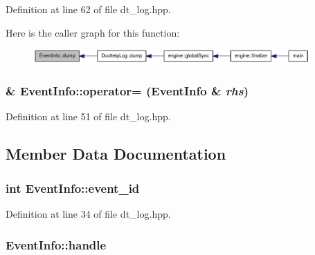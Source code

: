 Definition at line 62 of file dt\_\-log.hpp.

Here is the caller graph for this function:\nopagebreak
\begin{figure}[H]
\begin{center}
\leavevmode
\includegraphics[width=299pt]{struct_event_info_a3e4a489eec9f1f7bf9cc9d9fc6c6d8de_icgraph}
\end{center}
\end{figure}
\hypertarget{struct_event_info_a6a1a924d06fad413aa399c571814d37c}{
\subsubsection[{operator=}]{\& EventInfo::operator= ({\bf EventInfo} \& {\em rhs})}}
\label{struct_event_info_a6a1a924d06fad413aa399c571814d37c}


Definition at line 51 of file dt\_\-log.hpp.

\subsection{Member Data Documentation}
\hypertarget{struct_event_info_ab018b649c278ec6f413462ffa631e272}{
\subsubsection[{event\_\-id}]{\setlength{\rightskip}{0pt plus 5cm}int {\bf EventInfo::event\_\-id}}}
\label{struct_event_info_ab018b649c278ec6f413462ffa631e272}


Definition at line 34 of file dt\_\-log.hpp.\hypertarget{struct_event_info_a488a554eb65438ca63e7923f74f7f7b7}{
\subsubsection[{handle}]{ {\bf EventInfo::handle}}}
\label{struct_event_info_a488a554eb65438ca63e7923f74f7f7b7}


